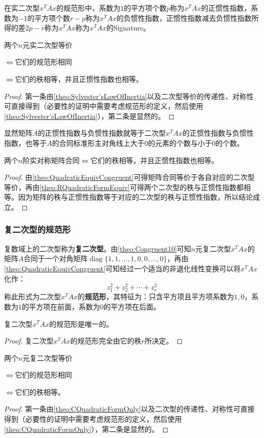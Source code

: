 \begin{definition}
	在实二次型$x^TAx$的规范形中，系数为$1$的平方项个数$p$称为$x^TAx$的正惯性指数，系数为$-1$的平方项个数$r-p$称为$x^TAx$的负惯性指数，正惯性指数减去负惯性指数所得的差$2p-r$称为$x^TAx$称为$x^TAx$的\gls{Signature}。
\end{definition}
\begin{theorem}\label{theo:RQuadraticFormEquiv}
	两个$n$元实二次型等价\par
	$\iff$它们的规范形相同\par
	$\iff$它们的秩相等，并且正惯性指数也相等。
\end{theorem}
\begin{proof}
	第一条由\cref{theo:Sylvester'sLawOfInertia}以及二次型等价的传递性、对称性可直接得到（必要性的证明中需要考虑规范形的定义，然后使用\cref{theo:Sylvester'sLawOfInertia}），第二条是显然的。
\end{proof}
显然矩阵$A$的正惯性指数与负惯性指数就等于二次型$x^TAx$的正惯性指数与负惯性指数，也等于$A$的合同标准形主对角线上大于$0$的元素的个数与小于$0$的个数。
\begin{theorem}
	两个$n$阶实对称矩阵合同$\iff$它们的秩相等，并且正惯性指数也相等。
\end{theorem}
\begin{proof}
	由\cref{theo:QuadraticEquivCongruent}可得矩阵合同等价于各自对应的二次型等价，再由\cref{theo:RQuadraticFormEquiv}可得两个二次型的秩与正惯性指数都相等。因为矩阵的秩与正惯性指数等于对应的二次型的秩与正惯性指数，所以结论成立。
\end{proof}
\subsubsection{复二次型的规范形}
\begin{definition}
	复数域上的二次型称为\textbf{复二次型}。由\cref{theo:Congruent10}可知$n$元复二次型$x^TAx$的矩阵$A$合同于一个对角矩阵$\operatorname{diag}\{1,1,\dots,1,0,0,\dots,0\}$，再由\cref{theo:QuadraticEquivCongruent}可知经过一个适当的非退化线性变换可以将$x^TAx$化作：
	\begin{equation*}
		z_1^2+z_2^2+\cdots+z_r^2
	\end{equation*}
	称此形式为二次型$x^TAx$的\textbf{规范形}，其特征为：只含平方项且平方项系数为$1,0$，系数为$1$的平方项在前面，系数为$0$的平方项在后面。
\end{definition}
\begin{theorem}\label{theo:CQuadraticFormOnly}
	复二次型$x^TAx$的规范形是唯一的。
\end{theorem}
\begin{proof}
	复二次型$x^TAx$的规范形完全由它的秩$r$所决定。
\end{proof}
\begin{theorem}
	两个$n$元复二次型等价\par
	$\iff$它们的规范形相同\par
	$\iff$它们的秩相等。
\end{theorem}
\begin{proof}
	第一条由\cref{theo:CQuadraticFormOnly}以及二次型的传递性、对称性可直接得到（必要性的证明中需要考虑规范形的定义，然后使用\cref{theo:CQuadraticFormOnly}），第二条是显然的。
\end{proof}

